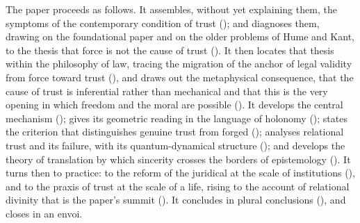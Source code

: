 The paper proceeds as follows. It assembles, without yet explaining them, the symptoms of the contemporary condition of trust (); and diagnoses them, drawing on the foundational paper and on the older problems of Hume and Kant, to the thesis that force is not the cause of trust (). It then locates that thesis within the philosophy of law, tracing the migration of the anchor of legal validity from force toward trust (), and draws out the metaphysical consequence, that the cause of trust is inferential rather than mechanical and that this is the very opening in which freedom and the moral are possible (). It develops the central mechanism (); gives its geometric reading in the language of holonomy (); states the criterion that distinguishes genuine trust from forged (); analyses relational trust and its failure, with its quantum-dynamical structure (); and develops the theory of translation by which sincerity crosses the borders of epistemology (). It turns then to practice: to the reform of the juridical at the scale of institutions (), and to the praxis of trust at the scale of a life, rising to the account of relational divinity that is the paper's summit (). It concludes in plural conclusions (), and closes in an envoi.
